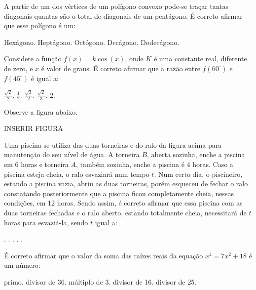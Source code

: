 \begin{question}%
A partir de um dos vértices de um polígono convexo pode-se traçar tantas diagonais quantas são o total de diagonais de um pentágono. É correto afirmar que esse polígono é um:
    \begin{tasks}
        \task Hexágono.
        \task Heptágono.
        \task Octógono.
        \task Decágono.
        \task Dodecágono.
    \end{tasks}
\end{question}

\begin{question}%
Considere a função \(f(x) = k \cos(x)\), onde \(K\) é uma constante real, diferente de zero, e \(x\) é valor de graus. É correto afirmar que a razão entre \(f(60^\circ)\) e \(f(45^\circ)\) é igual a:
    \begin{tasks}
        \task \(\frac{\sqrt{2}}{2}\).
        \task \(\frac{1}{2}\).
        \task \(\frac{\sqrt{3}}{2}\).
        \task \(\frac{\sqrt{2}}{3}\).
        \task \(2\).
    \end{tasks}
\end{question}

\begin{question}%
Observe a figura abaixo.

INSERIR FIGURA

Uma piscina se utiliza das duas torneiras e do ralo da figura acima para manutenção do seu nível de água. A torneira \(B\), aberta sozinha, enche a piscina em 6 horas e torneira \(A\), também sozinha, enche a piscina é 4 horas. Caso a piscina esteja cheia, o ralo esvaziará num tempo \(t\). Num certo dia, o piscineiro, estando a piscina vazia, abriu as duas torneiras, porém esqueceu de fechar o ralo constatando posteriormente que a piscina ficou completamente cheia, nessas condições, em 12 horas. Sendo assim, é correto afirmar que essa piscina com as duas torneiras fechadas e o ralo aberto, estando totalmente cheia, necessitará de \(t\) horas para esvaziá-la, sendo \(t\) igual a:
    \begin{tasks}
        .
        .
        .
        .
        .
    \end{tasks}
\end{question}

\begin{question}%
É correto afirmar que o valor da soma das raízes reais da equação \(x^4 = 7x^2 + 18\) é um número:
    \begin{tasks}
        \task primo.
        \task divisor de 36.
        \task múltiplo de 3.
        \task divisor de 16.
        \task divisor de 25.
    \end{tasks}
\end{question}

